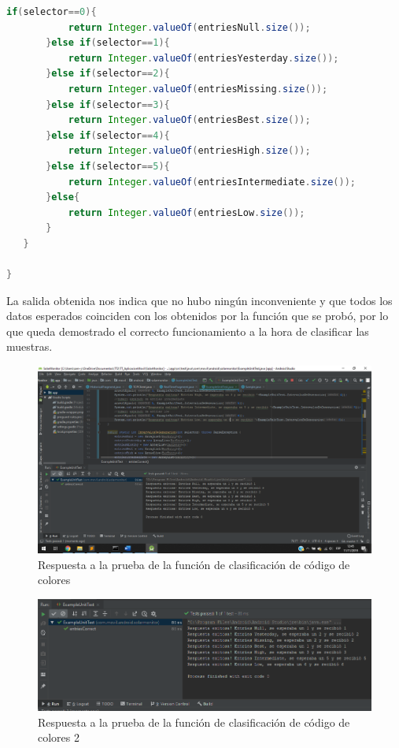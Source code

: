 \begin{lstlisting}[language= Java, frame=single]
       if(selector==0){
           return Integer.valueOf(entriesNull.size());
       }else if(selector==1){
           return Integer.valueOf(entriesYesterday.size());
       }else if(selector==2){
           return Integer.valueOf(entriesMissing.size());
       }else if(selector==3){
           return Integer.valueOf(entriesBest.size());
       }else if(selector==4){
           return Integer.valueOf(entriesHigh.size());
       }else if(selector==5){
           return Integer.valueOf(entriesIntermediate.size());
       }else{
           return Integer.valueOf(entriesLow.size());
       }
   }

}

\end{lstlisting}

La salida obtenida nos indica que no hubo ningún inconveniente y que todos los datos esperados coinciden con los obtenidos por la función que se probó, por lo que queda demostrado el correcto funcionamiento a la hora de clasificar las muestras. 

\begin{figure}[H]
	\centering
	\includegraphics[scale=.4]{Capitulo5/images/PruebaCodigoDeColores.png}
	\caption{Respuesta a la prueba de la función de clasificación de código de colores}	
	\label{fig:Codigo_de_colores}
\end{figure} 

\begin{figure}[H]
	\centering
	\includegraphics[scale=.4]{Capitulo5/images/PruebaCodigoDeColores2.png}
	\caption{Respuesta a la prueba de la función de clasificación de código de colores 2}	
	\label{fig:Codigo_de_colores2}
\end{figure} 


